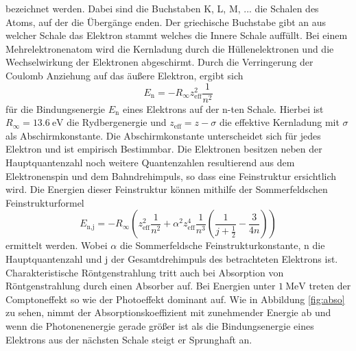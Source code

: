  bezeichnet werden. Dabei sind die Buchstaben K, L, M, ... die Schalen des Atoms, auf der die Übergänge enden. Der griechische Buchstabe gibt an aus welcher Schale das Elektron stammt welches die Innere Schale auffüllt.
 Bei einem Mehrelektronenatom wird die Kernladung durch die Hüllenelektronen und die Wechselwirkung der Elektronen abgeschirmt. Durch die Verringerung der Coulomb Anziehung auf das äußere Elektron, ergibt sich 
 \begin{equation}
     E_\text{n}=-R_{\infty} z_\text{eff}^2 \frac{1}{n^2}
     \label{eqn:Bindungse}
 \end{equation}
 für die Bindungsenergie $E_\text{n}$ eines Elektrons auf der n-ten Schale. Hierbei ist $R_{\infty}=\SI{13.6}{\electronvolt}$ die Rydbergenergie und $z_\text{eff}=z - \sigma$ die effektive Kernladung mit $\sigma$ als Abschirmkonstante.
 Die Abschirmkonstante unterscheidet sich für jedes Elektron und ist  empirisch Bestimmbar. Die Elektronen besitzen neben der Hauptquantenzahl noch weitere Quantenzahlen resultierend aus dem Elektronenspin und dem Bahndrehimpuls, so dass eine Feinstruktur ersichtlich wird.
 Die Energien dieser Feinstruktur können mithilfe der Sommerfeldschen Feinstrukturformel 
 \begin{equation}
     E_\text{n,j}=-R_{\infty} \left(z_\text{eff}^2 \frac{1}{n^2} + \alpha^2 z_\text{eff}^4 \frac{1}{n^3} \left(\frac{1}{j+\frac{1}{2}} - \frac{3}{4n}\right) \right)
     \label{eqn:sommerfeld}
 \end{equation}
ermittelt werden. Wobei $\alpha$ die Sommerfeldsche Feinstrukturkonstante, n die Hauptquantenzahl und j der Gesamtdrehimpuls des betrachteten Elektrons ist.
\\
Charakteristische Röntgenstrahlung tritt auch bei Absorption von Röntgenstrahlung durch einen Absorber auf. Bei Energien unter $\SI{1}{\mega \electronvolt}$
treten der Comptoneffekt so wie der Photoeffekt dominant auf. Wie in Abbildung \ref{fig:abso} zu sehen, nimmt der Absorptionskoeffizient mit zunehmender Energie ab und wenn die Photonenenergie gerade größer ist als die Bindungsenergie eines Elektrons aus der nächsten Schale steigt er Sprunghaft an.

